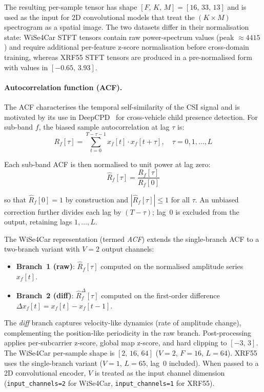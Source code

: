 \documentclass[english,bibtex]{kththesis}
\begin{document}
The resulting per-sample tensor has shape $[F,\,K,\,M] = [16,\,33,\,13]$ and is used as the input for 2D convolutional models that treat the $(K \times M)$ spectrogram as a spatial image. The two datasets differ in their normalisation state: WiSe4Car STFT tensors contain raw power-spectrum values (peak $\approx 4415$) and require additional per-feature z-score normalisation before cross-domain training, whereas XRF55 STFT tensors are produced in a pre-normalised form with values in $[-0.65,\, 3.93]$.

\paragraph{Autocorrelation function (ACF).}

The ACF characterises the temporal self-similarity of the CSI signal and is motivated by its use in DeepCPD~\cite{jayaweera2025deepcpd} for cross-vehicle child presence detection. For sub-band $f$, the biased sample autocorrelation at lag $\tau$ is:
\begin{equation}
  R_f[\tau]
    = \sum_{t=0}^{T-\tau-1} x_f[t]\cdot x_f[t + \tau],\quad \tau = 0,1,\ldots,L
\end{equation}

Each sub-band ACF is then normalised to unit power at lag zero:
\begin{equation}
  \hat{R}_f[\tau] = \frac{R_f[\tau]}{R_f[0]}
\end{equation}

so that $\hat{R}_f[0] = 1$ by construction and $|\hat{R}_f[\tau]| \leq 1$ for all $\tau$. An unbiased correction further divides each lag by $(T - \tau)$; lag~0 is excluded from the output, retaining lags $1,\ldots,L$.

The WiSe4Car representation (termed \emph{ACF}) extends the single-branch ACF to a two-branch variant with $V = 2$ output channels:
\begin{itemize}
  \item \textbf{Branch~1 (raw)}: $\hat{R}_f[\tau]$ computed on the normalised amplitude series $x_f[t]$.
  \item \textbf{Branch~2 (diff)}: $\hat{R}_f^{\Delta}[\tau]$ computed on the first-order difference $\Delta x_f[t] = x_f[t] - x_f[t{-}1]$.
\end{itemize}
The \emph{diff} branch captures velocity-like dynamics (rate of amplitude change), complementing the position-like periodicity in the raw branch. Post-processing applies per-subcarrier z-score, global map z-score, and hard clipping to $[-3,\,3]$. The WiSe4Car per-sample shape is $[2,\,16,\,64]$ ($V{=}2$, $F{=}16$, $L{=}64$). XRF55 uses the single-branch variant ($V{=}1$, $L{=}65$, lag~0 included). When passed to a 2D convolutional encoder, $V$ is treated as the input channel dimension (\texttt{input\_channels=2} for WiSe4Car, \texttt{input\_channels=1} for XRF55).
\end{document}
